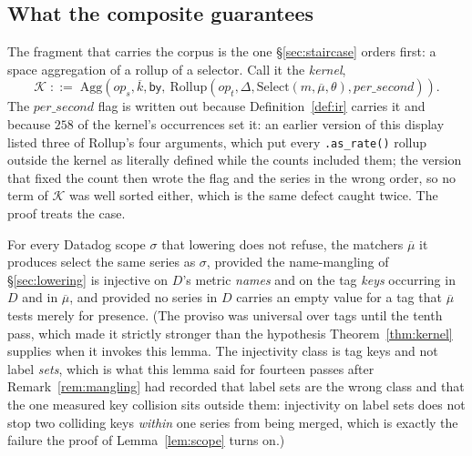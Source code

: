 \iffull\fi
\iffull\fi

\subsection{What the composite guarantees}
\label{sec:kernel-soundness}

The fragment that carries the corpus is the one \S\ref{sec:staircase} orders first:
a space aggregation of a rollup of a selector. Call it the \emph{kernel},
\[
\mathcal{K}\;::=\;\mathrm{Agg}(\mathit{op}_s,\overline{k},\mathsf{by},\
\mathrm{Rollup}(\mathit{op}_t,\Delta,\mathrm{Select}(m,\overline{\mu},\theta),\mathit{per\_second})).
\]
The $\mathit{per\_second}$ flag is written out because Definition~\ref{def:ir} carries it
and because $258$ of the kernel's occurrences set it: an earlier version of this display
listed three of $\mathrm{Rollup}$'s four arguments, which put every \texttt{.as\_rate()}
rollup outside the kernel as literally defined while the counts included them; the
version that fixed the count then wrote the flag and the series in the wrong order, so
no term of $\mathcal{K}$ was well sorted either, which is the same defect caught twice. The
proof \apin{app:proofs} treats the case.

\begin{lemma}\label{lem:scope}
For every Datadog scope $\sigma$ that lowering does not refuse, the matchers
$\overline{\mu}$ it produces select the same series as $\sigma$, provided the
name-mangling of \S\ref{sec:lowering} is injective on $D$'s metric \emph{names} and on
the tag \emph{keys} occurring in $D$ and in $\overline{\mu}$, and provided no series in
$D$ carries an empty value for a tag that $\overline{\mu}$ tests merely for presence.
(The proviso was universal over tags until the tenth pass, which made it strictly
stronger than the hypothesis Theorem~\ref{thm:kernel} supplies when it invokes this
lemma. The injectivity class is tag keys and not label \emph{sets}, which is what this
lemma said for fourteen passes after Remark~\ref{rem:mangling} had recorded that label
sets are the wrong class and that the one measured key collision sits outside them:
injectivity on label sets does not stop two colliding keys \emph{within} one series from
being merged, which is exactly the failure the proof of Lemma~\ref{lem:scope} turns on.)
\end{lemma}

\iffull\fi
\iffull\fi

